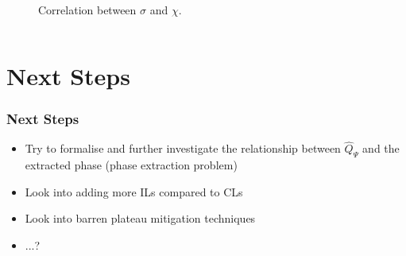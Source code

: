 \documentclass{beamer}
\begin{document}
\begin{frame}
\begin{columns}
\begin{column}{0.5\textwidth}
\begin{figure}
\caption{Correlation between $\sigma$ and $\chi$.}
\end{figure}
\end{column}
\end{columns}
\end{frame}

\section{Next Steps}

\begin{frame}
\frametitle{Next Steps}
\begin{itemize}
\item Try to formalise and further investigate the relationship between $\hat{Q}_\Psi$ and the extracted phase (phase extraction problem)
\item Look into adding more ILs compared to CLs 
\item Look into barren plateau mitigation techniques 
\item ...? 
\end{itemize}
\end{frame}
\end{document}
